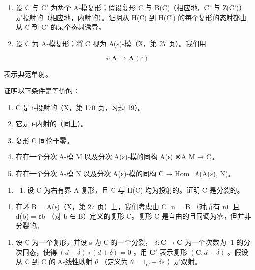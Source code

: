 \begin{enumerate}
\def\labelenumi{\arabic{enumi})}
\setcounter{enumi}{1}
\item
  设 C 与 C' 为两个 A-模复形；假设复形 C 与 B(C)（相应地，C' 与 Z(C')）是投射的（相应地，内射的）。证明从 H(C) 到 H(C') 的每个复形的态射都由从 C 到 C' 的某个态射诱导。
\item
  设 C 为 A-模复形；将 C 视为 A(ε)-模（X，第 27 页）。我们用
\end{enumerate}

\[
i: \mathbf {A} \rightarrow \mathbf {A} (\varepsilon)
\]

表示典范单射。

证明以下条件是等价的：

\begin{enumerate}
\def\labelenumi{(\roman{enumi})}
\item
  C 是 i-投射的（X，第 170 页，习题 19）。
\item
  它是 i-内射的（同上）。
\item
  复形 C 同伦于零。
\item
  存在一个分次 A-模 M 以及分次 A(ε)-模的同构 A(ε) ⊗A M → C。
\item
  存在一个分次 A-模 N 以及分次 A(ε)-模的同构 C → Hom\_A(A(ε), N)。
\end{enumerate}

\begin{enumerate}
\def\labelenumi{\arabic{enumi})}
\setcounter{enumi}{3}
\tightlist
\item
  \begin{enumerate}
  \def\labelenumii{\alph{enumii})}
  \tightlist
  \item
    设 C 为右有界 A-复形，且 C 与 H(C) 均为投射的。证明 C 是分裂的。
  \end{enumerate}
\end{enumerate}

\begin{enumerate}
\def\labelenumi{\alph{enumi})}
\setcounter{enumi}{1}
\tightlist
\item
  在环 B = A(ε)（X，第 27 页）上，我们考虑由 C\_n = B （对所有 n）且 d(b) = εb （对 b ∈ B）定义的复形 C。复形 C 是自由的且同调为零，但并非分裂的。
\end{enumerate}

\begin{enumerate}
\def\labelenumi{\arabic{enumi})}
\setcounter{enumi}{4}
\tightlist
\item
  设 C 为一个复形，并设 s 为 C 的一个分裂， \(\delta: \mathbf{C} \to \mathbf{C}\) 为一个次数为 -1 的分次同态，使得 \((d + \delta) \circ (d + \delta) = 0\) 。用 \(\mathbf{C}'\) 表示复形 \((\mathbf{C}, d + \delta)\) 。假设从 C 到 C 的 A-线性映射 \(\theta\) （定义为 \(\theta = 1_C + \delta s\) ）是双射。
\end{enumerate}

